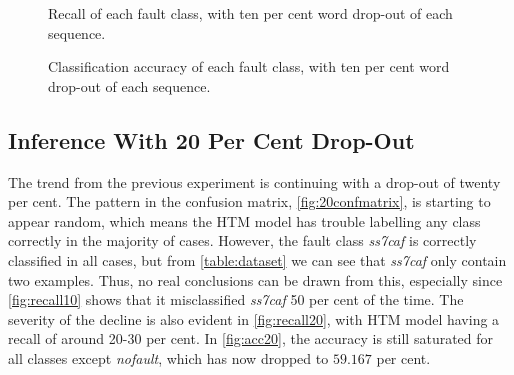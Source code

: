 \begin{figure}[H]
  \centering
    \scalebox{.61}{}
    \caption{Recall of each fault class, with ten per cent word drop-out of each sequence.}
    \label{fig:recall10}

    \vspace*{\floatsep}

    \scalebox{.61}{}
    \caption{Classification accuracy of each fault class, with ten per cent word drop-out of each sequence.}
    \label{fig:acc10}
\end{figure}



\subsection{Inference With 20 Per Cent Drop-Out}
The trend from the previous experiment is continuing with a drop-out of twenty per cent. The pattern in the confusion matrix, \autoref{fig:20confmatrix}, is starting to appear random, which means the HTM model has trouble labelling any class correctly in the majority of cases. However, the fault class \textit{ss7caf} is correctly classified in all cases, but from \autoref{table:dataset} we can see that \textit{ss7caf} only contain two examples. Thus, no real conclusions can be drawn from this, especially since \autoref{fig:recall10} shows that it misclassified \textit{ss7caf} 50 per cent of the time. The severity of the decline is also evident in \autoref{fig:recall20}, with HTM model having a recall of around 20-30 per cent. In \autoref{fig:acc20}, the accuracy is still saturated for all classes except \textit{nofault}, which has now dropped to $59.167$ per cent. 

